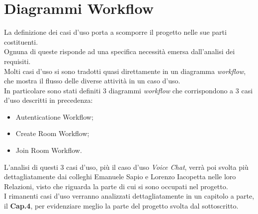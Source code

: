 \section{Diagrammi Workflow}
La definizione dei casi d'uso porta a scomporre il progetto nelle sue parti costituenti. \\Ognuna di queste risponde ad una specifica necessità emersa dall'analisi dei requisiti. \\Molti casi d'uso si sono tradotti quasi direttamente in un diagramma \textit{workflow}, che mostra il flusso delle diverse attività in un caso d'uso. \\In particolare sono stati definiti 3 diagrammi \textit{workflow} che corrispondono a 3 casi d'uso descritti in precedenza:
\begin{itemize}
   \item Autenticatione Workflow;
   \item Create Room Workflow;
   \item Join Room Workflow.
\end{itemize}
L'analisi di questi 3 casi d'uso, più il caso d'uso \textit{Voice Chat}, verrà poi svolta più dettagliatamente dai colleghi Emanuele Sapio e Lorenzo Iacopetta nelle loro Relazioni, visto che riguarda la parte di cui si sono occupati nel progetto.
\\I rimanenti casi d'uso verranno analizzati dettagliatamente in un capitolo a parte, il \textbf{Cap.4}, per evidenziare meglio la parte del progetto svolta dal sottoscritto.
